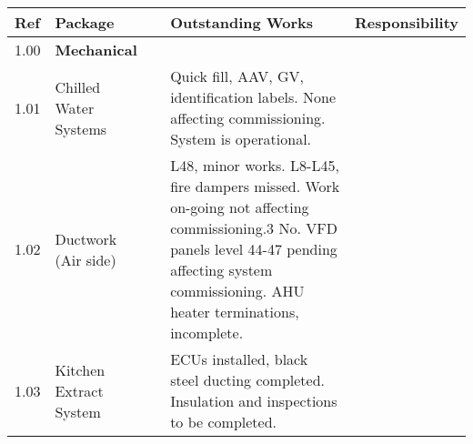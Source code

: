 \begin{fullwidth} 
\label{SLsystems}
\RaggedRight
\begin{longtable}{@{}lp{3.5cm}@{}lp{5cm}p{1.5cm}}
\toprule
Ref	&Package	& &Outstanding Works& Responsibility\\
\midrule
1.00	&\textbf{Mechanical}	&	&&\\
1.01	&Chilled Water Systems	&	&Quick fill, AAV, GV, identification labels. None affecting commissioning. System is operational. &\\
1.02	&Ductwork (Air side)  &		& L48, minor works. L8-L45, fire dampers missed. Work on-going not affecting commissioning.3 No. VFD panels level 44-47 pending affecting system commissioning. AHU heater terminations, incomplete.&\\
1.03    &Kitchen Extract System && ECUs installed, black steel ducting completed. Insulation and inspections to be completed.&\\



\end{longtable}
\end{fullwidth}
